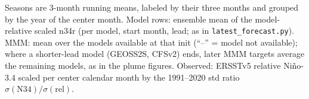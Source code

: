 \documentclass{article}
\begin{document}
\noindent Seasons are 3-month running means, labeled by their three months and grouped by the year of the center month. Model rows: ensemble mean of the model-relative scaled n34r (per model, start month, lead; as in \texttt{latest\_forecast.py}). MMM: mean over the models available at that init (``--'' = model not available); where a shorter-lead model (GEOSS2S, CFSv2) ends, later MMM targets average the remaining models, as in the plume figures. Observed: ERSSTv5 relative Ni\~no-3.4 scaled per center calendar month by the 1991--2020 std ratio $\sigma(\mathrm{N34})/\sigma(\mathrm{rel})$.
\end{document}
